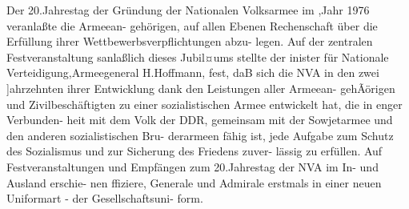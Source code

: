 

Der 20.Jahrestag der Gründung der Nationalen
Volksarmee im ,Jahr 1976 veranlaßte die Armeean-
gehörigen, auf allen Ebenen Rechenschaft über die
Erfüllung ihrer Wettbewerbsverpflichtungen abzu-
legen.
Auf der zentralen Festveranstaltung
sanlaßlich
dieses Jubil¤ums stellte der inister für Nationale
Verteidigung,Armeegeneral H.Hoffmann, fest,
daB sich die NVA in den zwei ]ahrzehnten ihrer
Entwicklung dank den Leistungen aller Armeean-
gehÃörigen und Zivilbeschäftigten zu einer sozialistischen Armee entwickelt hat, die in enger Verbunden-
heit mit dem Volk der DDR, gemeinsam mit der
Sowjetarmee und den anderen sozialistischen Bru-
derarmeen fähig ist, jede Aufgabe zum Schutz des
Sozialismus und zur Sicherung des Friedens zuver-
lässig zu erfüllen.
Auf Festveranstaltungen und Empfängen zum
20.Jahrestag der NVA im In- und Ausland erschie-
nen ffiziere, Generale und Admirale erstmals in
einer neuen Uniformart - der Gesellschaftsuni-
form.